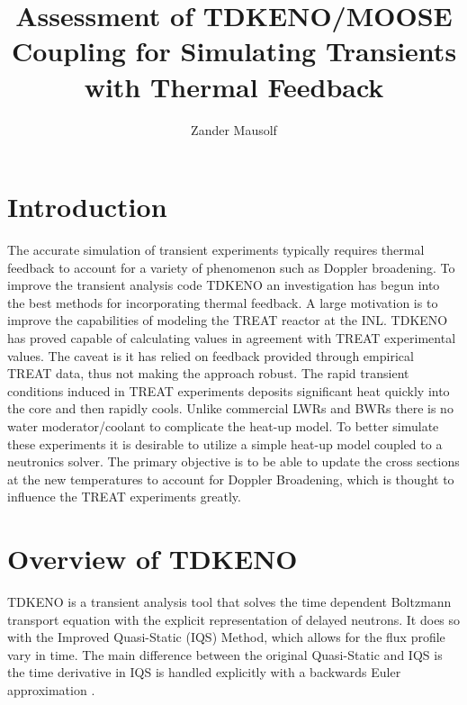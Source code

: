 \documentclass[11pt]{article}
\begin{document}
%
\author{Zander Mausolf}
\title{Assessment of TDKENO/MOOSE Coupling for Simulating Transients with Thermal Feedback}
\maketitle

\section{Introduction}
The accurate simulation of transient experiments typically requires thermal feedback to account for a variety of phenomenon such as Doppler broadening. To improve the transient analysis code TDKENO an investigation has begun into the best methods for incorporating thermal feedback. A large motivation is to improve the capabilities of modeling the TREAT reactor at the INL. TDKENO has proved capable of calculating values in agreement with TREAT experimental values.  The caveat is it has relied on feedback provided through empirical TREAT data, thus not making the approach robust.
The rapid transient conditions induced in TREAT experiments deposits significant heat quickly into the core and then rapidly cools.  Unlike commercial LWRs and BWRs there is no water moderator/coolant to complicate the heat-up model.  To better simulate these experiments it is desirable to utilize a simple heat-up model coupled to a neutronics solver. The primary objective is to be able to update the cross sections at the new temperatures to account for Doppler Broadening, which is thought to influence the TREAT experiments greatly.  

\section{Overview of TDKENO}

TDKENO is a transient analysis tool that solves the time dependent Boltzmann transport equation with the explicit representation of delayed neutrons. It does so with the Improved Quasi-Static (IQS) Method, which allows for the flux profile vary in time.  The main difference between the original Quasi-Static and IQS is the time derivative in IQS is handled explicitly with a backwards Euler approximation \cite{goluoglu2001time}. 
\end{document}
